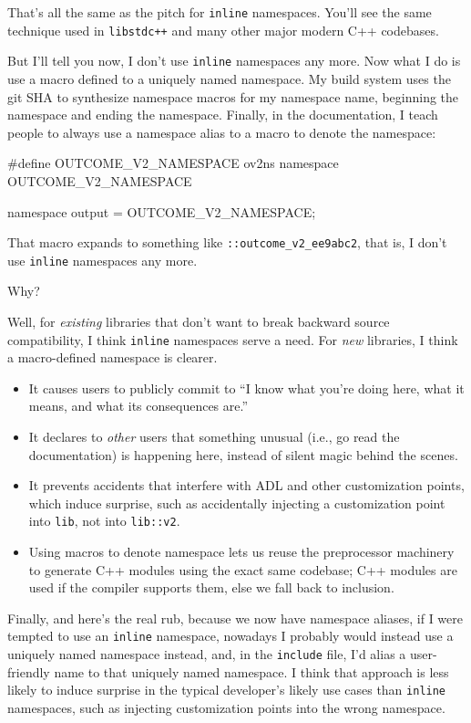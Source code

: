 That's all the same as the pitch for \lstinline!inline! namespaces. You'll
see the same technique used in \lstinline!libstdc++! and many other major modern C++
codebases.

But I'll tell you now, I don't use \lstinline!inline! namespaces any more.
Now what I do is use a macro defined to a uniquely named namespace. My
build system uses the git SHA to synthesize namespace macros for my
namespace name, beginning the namespace and ending the namespace.
Finally, in the documentation, I teach people to always use a namespace
alias to a macro to denote the namespace:

\begin{emcppshiddenlisting}[emcppsbatch=e10]
#define OUTCOME_V2_NAMESPACE ov2ns
namespace OUTCOME_V2_NAMESPACE {
}
\end{emcppshiddenlisting}
\begin{emcppslisting}[emcppsbatch=e10]
namespace output = OUTCOME_V2_NAMESPACE;
\end{emcppslisting} 

\noindent That macro expands to something like \lstinline!::outcome_v2_ee9abc2!,
that is, I don't use \lstinline!inline! namespaces any more.

Why?

Well, for \emph{existing} libraries that don't want to break backward
source compatibility, I think \lstinline!inline! namespaces serve a need.
For \emph{new} libraries, I think a macro-defined namespace is clearer.
\begin{itemize}
\item{It causes users to publicly commit to ``I know what you’re doing here, what it means, and what its consequences are.''}
\item{It declares to \emph{other} users that something unusual (i.e., go read the documentation) is happening here, instead of silent magic behind the scenes.}
\item{It prevents accidents that interfere with ADL and other customization points, which induce surprise, such as accidentally injecting a customization point into \lstinline!lib!, not into \lstinline!lib::v2!.}
\item{Using macros to denote namespace lets us reuse the preprocessor machinery to generate C++ modules using the exact same codebase; C++ modules are used if the compiler supports them, else we fall back to inclusion.}
\end{itemize}

Finally, and here's the real rub, because we now have namespace aliases,
if I were tempted to use an \lstinline!inline! namespace, nowadays I probably would
instead use a uniquely named namespace instead, and, in the \lstinline!include! file,
I'd alias a user-friendly name to that uniquely named namespace. I think
that approach is less likely to induce surprise in the typical
developer's likely use cases than \lstinline!inline! namespaces, such as
injecting customization points into the wrong namespace.

